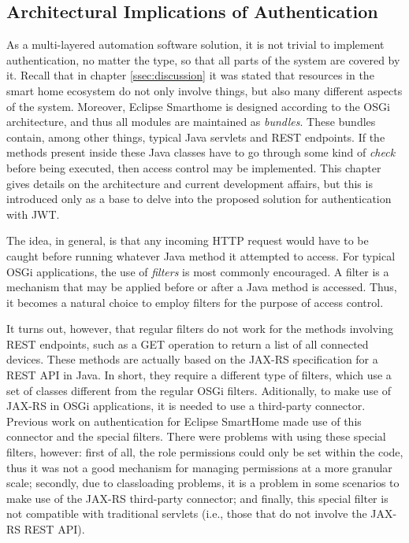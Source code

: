 \documentclass[12pt]{article}
\begin{document}
\subsection{Architectural Implications of Authentication}

As a multi-layered automation software solution, it is not trivial to implement authentication, no matter the type, so that all parts of the system are covered by it. Recall that in chapter \ref{ssec:discussion} it was stated that resources in the smart home ecosystem do not only involve things, but also many different aspects of the system. Moreover, Eclipse Smarthome is designed according to the OSGi architecture, and thus all modules are maintained as \emph{bundles}. These bundles contain, among other things, typical Java servlets and REST endpoints. If the methods present inside these Java classes have to go through some kind of \emph{check} before being executed, then access control may be implemented. This chapter gives details on the architecture and current development affairs, but this is introduced only as a base to delve into the proposed solution for authentication with JWT.

The idea, in general, is that any incoming HTTP request would have to be caught before running whatever Java method it attempted to access. For typical OSGi applications, the use of \emph{filters} is most commonly encouraged. A filter is a mechanism that may be applied before or after a Java method is accessed. Thus, it becomes a natural choice to employ filters for the purpose of access control.

It turns out, however, that regular filters do not work for the methods involving REST endpoints, such as a GET operation to return a list of all connected devices. These methods are actually based on the JAX-RS specification for a REST API in Java. In short, they require a different type of filters, which use a set of classes different from the regular OSGi filters. Aditionally, to make use of JAX-RS in OSGi applications, it is needed to use a third-party connector. Previous work on authentication for Eclipse SmartHome made use of this connector and the special filters. There were problems with using these special filters, however: first of all, the role permissions could only be set within the code, thus it was not a good mechanism for managing permissions at a more granular scale; secondly, due to classloading problems, it is a problem in some scenarios to make use of the JAX-RS third-party connector; and finally, this special filter is not compatible with traditional servlets (i.e., those that do not involve the JAX-RS REST API).
\end{document}
